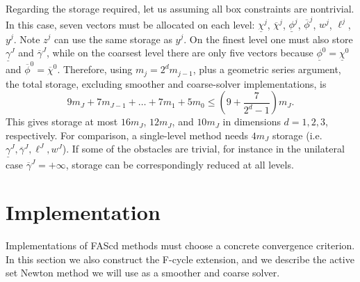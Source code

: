 \documentclass[letterpaper,final,12pt,reqno]{amsart}
\theoremstyle{cstyle}
\theoremstyle{cstyle*}
\theoremstyle{dstyle}
\numberwithin{equation}{section}
\numberwithin{figure}{section}
\numberwithin{table}{section}
\numberwithin{theorem}{section}
\begin{document}
Regarding the storage required, let us assuming all box constraints are nontrivial. In this case, seven vectors must be allocated on each level: $\underline{\chi}^j$, $\overline{\chi}^j$, $\underline{\phi}^j$, $\overline{\phi}^j$, $w^j$, $\ell^j$, $y^j$.  Note $z^j$ can use the same storage as $y^j$.  On the finest level one must also store $\underline{\gamma}^J$ and $\overline{\gamma}^J$, while on the coarsest level there are only five vectors because $\underline{\phi}^0=\underline{\chi}^0$ and $\overline{\phi}^0=\overline{\chi}^0$.  Therefore, using $m_j=2^d m_{j-1}$, plus a geometric series argument, the total storage, excluding smoother and coarse-solver implementations, is
\begin{equation}
9 m_J + 7 m_{J-1} + \dots + 7 m_1 + 5 m_0 \le \left(9 + \frac{7}{2^d - 1}\right) m_J.
\end{equation}
This gives storage at most $16m_J$, $12m_J$, and $10m_J$ in dimensions $d=1,2,3$, respectively.  For comparison, a single-level method needs $4 m_J$ storage (i.e.~$\underline{\gamma}^J,\overline{\gamma}^J,\ell^J,w^J$).  If some of the obstacles are trivial, for instance in the unilateral case $\overline{\gamma}^J=+\infty$, storage can be correspondingly reduced at all levels.


\section{Implementation} \label{sec:implementation}

Implementations of FAScd methods must choose a concrete convergence criterion.  In this section we also construct the F-cycle extension, and we describe the active set Newton method we will use as a smoother and coarse solver.
\end{document}

